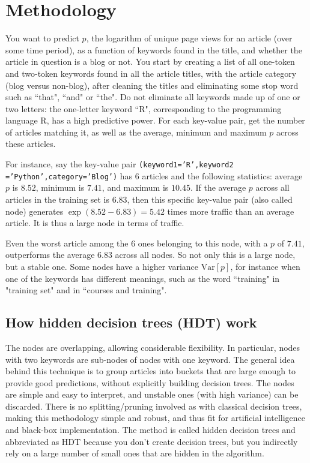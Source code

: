 \documentclass[oneside,10pt]{book}
\begin{document}
\section{Methodology} 

You want to predict $p$, the logarithm of unique page views for an article (over some time period), as a function of keywords found in the title, and whether the article in question is a blog or not.  You start by creating a list of all one-token and two-token keywords found in all the article titles, with the article category (blog versus non-blog), after cleaning the titles and eliminating some stop word such as ``that", ``and" or ``the". Do not eliminate all keywords made up of one or two letters: the one-letter keyword ``R", corresponding to the programming language R, has a high \textcolor{index}{predictive power}.
For each key-value pair, get the number of articles matching it, as well as the average, minimum and maximum $p$ across these articles.

For instance, say the  key-value pair \texttt{(keyword1='R',keyword2 ='Python',category='Blog')} has $6$ articles and  the following statistics: average $p$ is $8.52$, minimum 
 is $7.41$, and maximum is $10.45$. If the average $p$ across all articles in the training set is  $6.83$, then this specific key-value pair (also called node) generates $\exp(8.52 - 6.83) = 5.42$ times more traffic than an average article. It is thus a large node in terms of traffic. 

Even the worst article among the $6$ ones belonging to this node, with a $p$ of $7.41$, outperforms the average $6.83$ across all nodes. So not only this is a large node, but a stable one. Some nodes have a higher variance $\text{Var}[p]$, for instance when one of the keywords has different meanings, such as the word ``training" in "training set"  and in
 ``courses and training".


\subsection{How hidden decision trees (HDT) work}\label{algoaba}

The nodes are overlapping, allowing considerable flexibility. In particular, nodes with two keywords are sub-nodes of nodes with one keyword.  
The general idea behind this technique is to group articles into buckets that are large enough to provide good predictions, without explicitly building \textcolor{index}{decision trees}.  The nodes are simple and easy to interpret, and unstable ones (with high variance) can be discarded. There is no splitting/pruning involved as with classical decision trees, making this methodology simple and robust, and thus fit for artificial intelligence and black-box implementation. The method is called 
 \textcolor{index}{hidden decision trees} and abbreviated as \textcolor{index}{HDT} because you don't create decision trees, but you indirectly rely on a large number of small ones that are hidden in the
 algorithm.
\end{document}
